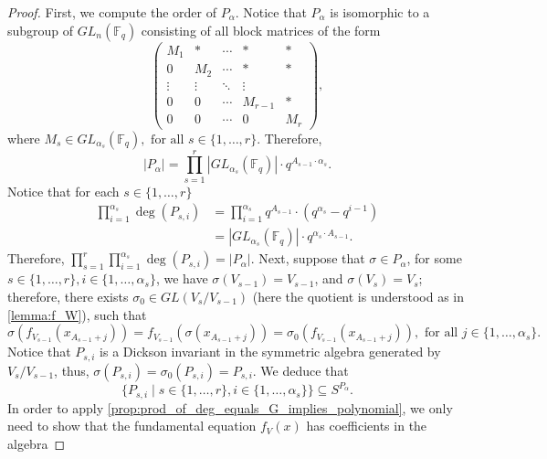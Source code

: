 \documentclass[12pt,a4paper]{report}
\theoremstyle{definition}
\theoremstyle{remark}
\theoremstyle{definition}
\begin{document}
\begin{proof}
    First, we compute the order of $P_{\alpha}$. Notice that $P_{\alpha}$ is isomorphic to a subgroup of $GL_n(\mathbb{F}_q)$ consisting of all block matrices of the form
    \begin{equation*}
        \begin{pmatrix}
M_1 & * & \cdots & * & *\\
0 & M_2 & \cdots & * & *\\
\vdots & \vdots & \ddots & \vdots\\
0 & 0 & \cdots & M_{r-1} & * \\
0 & 0 & \cdots & 0 & M_r
        \end{pmatrix},
    \end{equation*}
    where $M_s\in GL_{\alpha_s}(\mathbb{F}_q), \text{ for all } s\in \{1, \ldots, r\}$. Therefore, 
    \begin{equation*}
        |P_{\alpha}| = \prod\limits_{s=1}^{r}|GL_{\alpha_s}(\mathbb{F}_q)|\cdot q^{A_{s-1}\cdot \alpha_s}.
    \end{equation*}
    Notice that for each $s\in \{1,\ldots, r\}$ 
    \begin{align*}
        \prod\limits_{i=1}^{\alpha_s}\deg(P_{s, i}) &= \prod\limits_{i=1}^{\alpha_s}q^{A_{s-1}}\cdot (q^{\alpha_s}-q^{i-1})\\
        &=|GL_{\alpha_s}(\mathbb{F}_q)|\cdot q^{\alpha_s \cdot A_{s-1}}.
    \end{align*}
    Therefore, $\prod\limits_{s=1}^{r}\prod\limits_{i=1}^{\alpha_s}\deg(P_{s, i}) = |P_{\alpha}|$. Next, suppose that $\sigma\in P_{\alpha}$, for some $s\in \{1, \ldots, r\}, i\in \{1, \ldots, \alpha_s\}$, we have $\sigma(V_{s-1}) = V_{s-1}$, and $\sigma(V_s) = V_s$; therefore, there exists $\sigma_0\in GL(V_s/V_{s-1})$ (here the quotient is understood as in \cref{lemma:f_W}), such that
    \begin{equation*}
        \sigma(f_{V_{s-1}}(x_{A_{s-1}+j})) = f_{V_{s-1}}(\sigma(x_{A_{s-1}+j})) = \sigma_0(f_{V_{s-1}}(x_{A_{s-1}+j})), \text{ for all } j\in \{1, \ldots, \alpha_s\}.
    \end{equation*}
    Notice that $P_{s, i}$ is a Dickson invariant in the symmetric algebra generated by $V_{s}/V_{s-1}$, thus, $\sigma(P_{s, i}) = \sigma_0(P_{s, i}) = P_{s, i}$. We deduce that
    \begin{equation*}
        \{P_{s, i}\mid s\in \{1,\ldots, r\}, i\in \{1, \ldots, \alpha_s\}\}\subseteq S^{P_{\alpha}}.
    \end{equation*}
    In order to apply \cref{prop:prod_of_deg_equals_G_implies_polynomial}, we only need to show that the fundamental equation $f_V(x)$ has coefficients in the algebra 

\end{proof}
\end{document}

